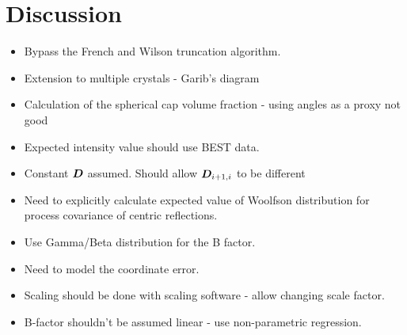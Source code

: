 \section{Discussion}
\label{sec:Discussion - Data Reduction}
\begin{itemize}
    \item Bypass the French and Wilson truncation algorithm.
    \item Extension to multiple crystals - Garib's diagram
    \item Calculation of the spherical cap volume fraction - using angles as a proxy not good
    \item Expected intensity value should use BEST data.
    \item Constant $\boldsymbol{D}$ assumed. Should allow $\boldsymbol{D}_{i+1, i}$ to be different
    \item Need to explicitly calculate expected value of Woolfson distribution for process covariance of centric reflections.
    \item Use Gamma/Beta distribution for the B factor.
    \item Need to model the coordinate error.
    \item Scaling should be done with scaling software - allow changing scale factor.
    \item B-factor shouldn't be assumed linear - use non-parametric regression.
\end{itemize}
